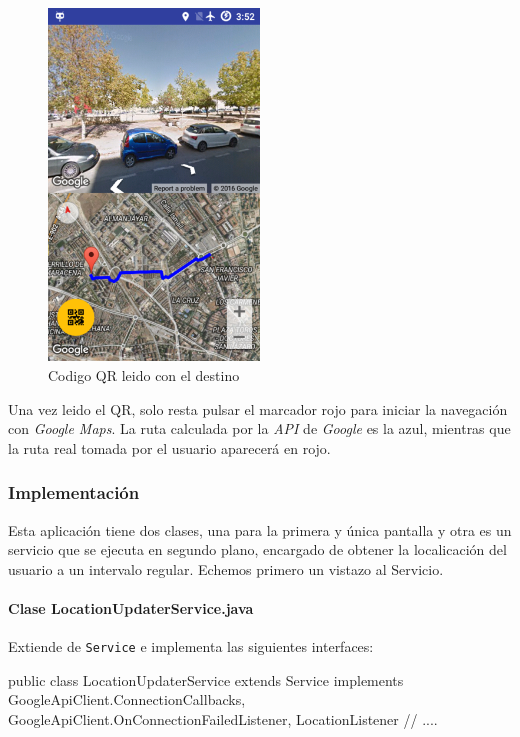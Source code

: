 \documentclass[	DIV=calc,%
							paper=a4,%
							fontsize=11pt]{scrartcl}	 					%
\begin{document}
\begin{figure}[H]
\centering
\includegraphics[width=0.5\textwidth]{./img/gqsqr_read.png}
\caption{Codigo QR leido con el destino}
\end{figure}

Una vez leido el QR, solo resta pulsar el marcador rojo para iniciar la
navegación con \emph{Google Maps}. La ruta calculada por la \emph{API}
de \emph{Google} es la azul, mientras que la ruta real tomada por el
usuario aparecerá en rojo.

\subsubsection{Implementación}\label{implementaciuxf3n-1}

Esta aplicación tiene dos clases, una para la primera y única pantalla y
otra es un servicio que se ejecuta en segundo plano, encargado de
obtener la localicación del usuario a un intervalo regular. Echemos
primero un vistazo al Servicio.

\paragraph{Clase
LocationUpdaterService.java}\label{clase-locationupdaterservice.java}

Extiende de \texttt{Service} e implementa las siguientes interfaces:

\begin{javacode}
	public class LocationUpdaterService extends Service implements
	        GoogleApiClient.ConnectionCallbacks,
	        GoogleApiClient.OnConnectionFailedListener,
	        LocationListener {
						// ....
					}
\end{javacode}
\end{document}

